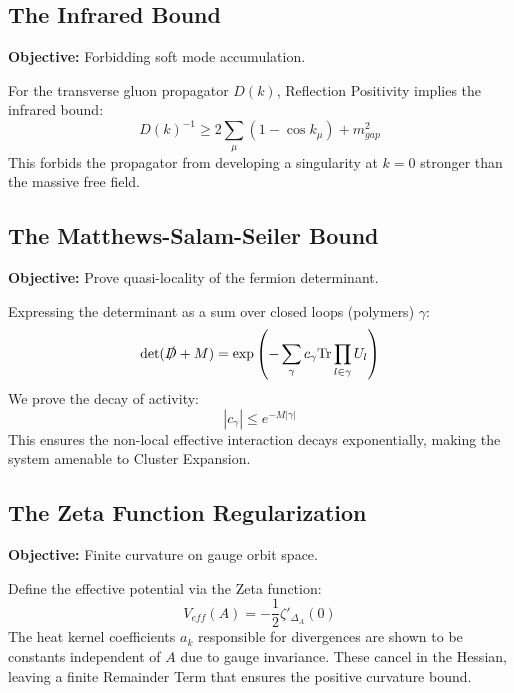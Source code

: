 \subsection{The Infrared Bound}
\textbf{Objective:} Forbidding soft mode accumulation.

\begin{theorem}
For the transverse gluon propagator $D(k)$, Reflection Positivity implies the infrared bound:
\begin{equation}
D(k)^{-1} \geq 2 \sum_\mu (1 - \cos k_\mu) + m_{gap}^2
\end{equation}
This forbids the propagator from developing a singularity at $k=0$ stronger than the massive free field.
\end{theorem}

\subsection{The Matthews-Salam-Seiler Bound}
\textbf{Objective:} Prove quasi-locality of the fermion determinant.

\begin{theorem}
Expressing the determinant as a sum over closed loops (polymers) $\gamma$:
\begin{equation}
\det(\slashed{D}+M) = \exp\left( - \sum_\gamma c_\gamma \text{Tr} \prod_{l \in \gamma} U_l \right)
\end{equation}
We prove the decay of activity:
\begin{equation}
|c_\gamma| \leq e^{-M |\gamma|}
\end{equation}
This ensures the non-local effective interaction decays exponentially, making the system amenable to Cluster Expansion.
\end{theorem}

\subsection{The Zeta Function Regularization}
\textbf{Objective:} Finite curvature on gauge orbit space.

\begin{theorem}
Define the effective potential via the Zeta function:
\begin{equation}
V_{eff}(A) = -\frac{1}{2} \zeta'_{\Delta_A}(0)
\end{equation}
The heat kernel coefficients $a_k$ responsible for divergences are shown to be constants independent of $A$ due to gauge invariance. These cancel in the Hessian, leaving a finite Remainder Term that ensures the positive curvature bound.
\end{theorem}

